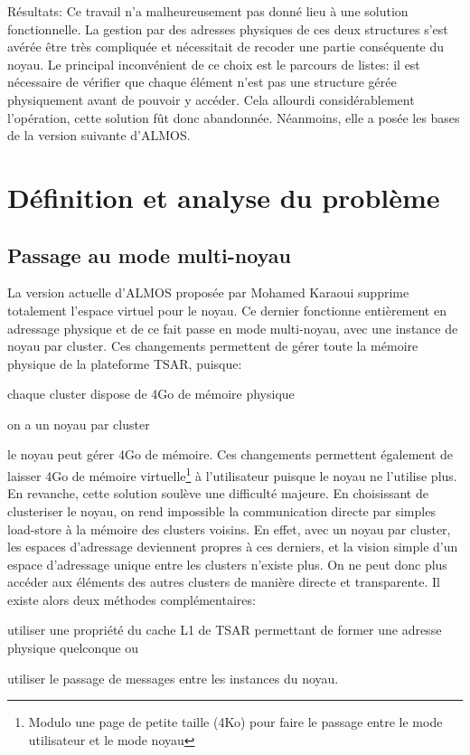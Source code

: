       \begin{paragraph}{Résultats:}
        Ce travail n'a malheureusement pas donné lieu à une solution
        fonctionnelle. La gestion par des adresses physiques de ces deux
        structures s'est avérée être très compliquée et nécessitait de recoder
        une partie conséquente du noyau. Le principal inconvénient de ce choix
        est le parcours de listes: il est nécessaire de vérifier que chaque
        élément n'est pas une structure gérée physiquement avant de pouvoir y
        accéder. Cela allourdi considérablement l'opération, cette solution fût
        donc abandonnée. Néanmoins, elle a posée les bases de la version
        suivante d'ALMOS.
      \end{paragraph}


  \section{Définition et analyse du problème}      

    \subsection{Passage au mode multi-noyau}
    \label{sec:multi-noyau}

      La version actuelle d'ALMOS proposée par Mohamed Karaoui supprime
      totalement l'espace virtuel pour le noyau. Ce dernier fonctionne
      entièrement en adressage physique et de ce fait passe en mode multi-noyau,
      avec une instance de noyau par cluster. Ces changements permettent de
      gérer toute la mémoire physique de la plateforme TSAR, puisque:
      \benumline \item chaque cluster dispose de 4Go de mémoire physique \item
      on a un noyau par cluster \item le noyau peut gérer 4Go de
      mémoire\eenumline. Ces changements permettent également de laisser 4Go de
      mémoire virtuelle\footnote{Modulo une page de petite taille (4Ko) pour
        faire le passage entre le mode utilisateur et le mode noyau} à
      l'utilisateur puisque le noyau ne l'utilise plus.\\

      En revanche, cette solution soulève une difficulté majeure. En choisissant
      de clusteriser le noyau, on rend impossible la communication directe par
      simples load-store à la mémoire des clusters voisins. En effet, avec un
      noyau par cluster, les espaces d'adressage deviennent propres à ces
      derniers, et la vision simple d'un espace d'adressage unique entre les
      clusters n'existe plus. On ne peut donc plus accéder aux éléments des
      autres clusters de manière directe et transparente. Il existe alors deux
      méthodes complémentaires:\benumline \item utiliser une propriété du cache
      L1 de TSAR permettant de former une adresse physique quelconque ou \item
      utiliser le passage de messages entre les instances du noyau\eenumline.\\

